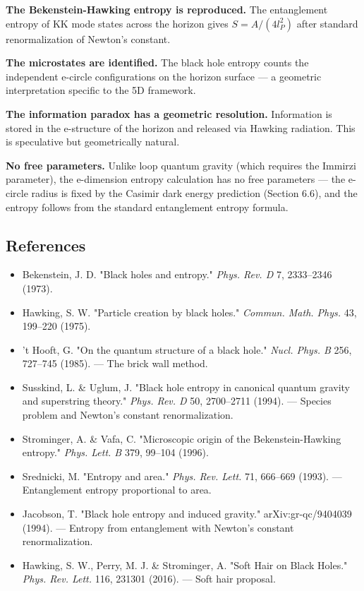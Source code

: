 \documentclass[aps,prd,preprint,superscriptaddress,longbibliography,floatfix]{revtex4-2}
\theoremstyle{remark}
\begin{document}
\textbf{The Bekenstein-Hawking entropy is reproduced.} The entanglement entropy of KK mode states across the horizon gives $S = A/(4l_P^{2})$ after standard renormalization of Newton's constant.

\textbf{The microstates are identified.} The black hole entropy counts the independent e-circle configurations on the horizon surface --- a geometric interpretation specific to the 5D framework.

\textbf{The information paradox has a geometric resolution.} Information is stored in the e-structure of the horizon and released via Hawking radiation. This is speculative but geometrically natural.

\textbf{No free parameters.} Unlike loop quantum gravity (which requires the Immirzi parameter), the e-dimension entropy calculation has no free parameters --- the e-circle radius is fixed by the Casimir dark energy prediction (Section 6.6), and the entropy follows from the standard entanglement entropy formula.



\subsection{References}


\begin{itemize}
  \item Bekenstein, J. D. "Black holes and entropy." \textit{Phys. Rev. D} 7, 2333--2346 (1973).
  \item Hawking, S. W. "Particle creation by black holes." \textit{Commun. Math. Phys.} 43, 199--220 (1975).
  \item 't Hooft, G. "On the quantum structure of a black hole." \textit{Nucl. Phys. B} 256, 727--745 (1985). --- The brick wall method.
  \item Susskind, L. \& Uglum, J. "Black hole entropy in canonical quantum gravity and superstring theory." \textit{Phys. Rev. D} 50, 2700--2711 (1994). --- Species problem and Newton's constant renormalization.
  \item Strominger, A. \& Vafa, C. "Microscopic origin of the Bekenstein-Hawking entropy." \textit{Phys. Lett. B} 379, 99--104 (1996).
  \item Srednicki, M. "Entropy and area." \textit{Phys. Rev. Lett.} 71, 666--669 (1993). --- Entanglement entropy proportional to area.
  \item Jacobson, T. "Black hole entropy and induced gravity." arXiv:gr-qc/9404039 (1994). --- Entropy from entanglement with Newton's constant renormalization.
  \item Hawking, S. W., Perry, M. J. \& Strominger, A. "Soft Hair on Black Holes." \textit{Phys. Rev. Lett.} 116, 231301 (2016). --- Soft hair proposal.
\end{itemize}
\end{document}
